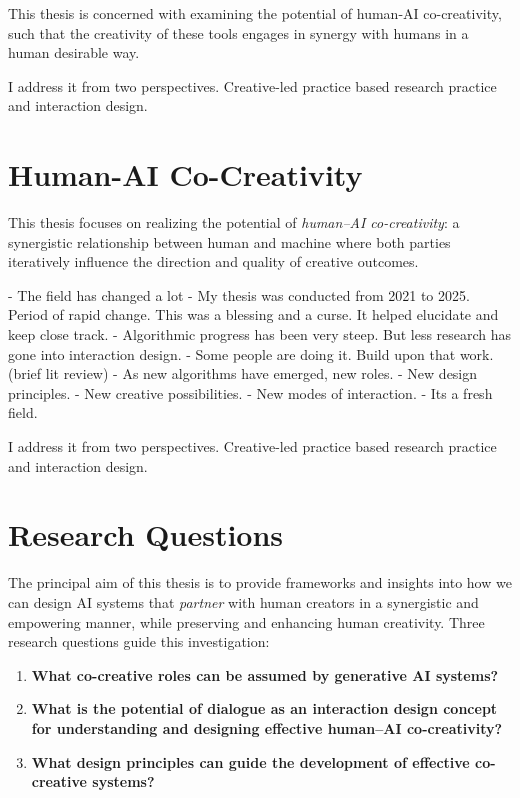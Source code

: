 This thesis is concerned with examining the potential of human-AI co-creativity, such that the creativity of these tools engages in synergy with humans in a human desirable way. 

I address it from two perspectives. Creative-led practice based research practice and interaction design. 

\section{Human-AI Co-Creativity}

This thesis focuses on realizing the potential of \emph{human--AI co-creativity}: a synergistic relationship between human and machine where both parties iteratively influence the direction and quality of creative outcomes. 

- The field has changed a lot
- My thesis was conducted from 2021 to 2025. Period of rapid change. This was a blessing and a curse. It helped elucidate and keep close track. 
- Algorithmic progress has been very steep. But less research has gone into interaction design. 
- Some people are doing it. Build upon that work. (brief lit review)
- As new algorithms have emerged, new roles.
- New design principles. 
- New creative possibilities. 
- New modes of interaction. 
- Its a fresh field. 

I address it from two perspectives. Creative-led practice based research practice and interaction design. 

\section{Research Questions}

The principal aim of this thesis is to provide frameworks and insights into how we can design AI systems that \emph{partner} with human creators in a synergistic and empowering manner, while preserving and enhancing human creativity. Three research questions guide this investigation:

\begin{enumerate}
    \item \textbf{What co-creative roles can be assumed by generative AI systems?} 
    \item \textbf{What is the potential of dialogue as an interaction design concept for understanding and designing effective human--AI co-creativity?}
    \item \textbf{What design principles can guide the development of effective co-creative systems?}
\end{enumerate}

